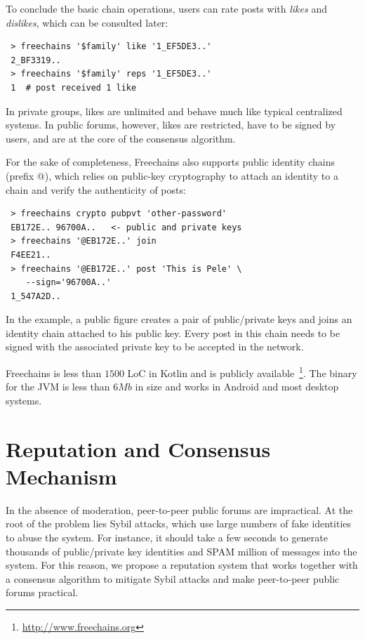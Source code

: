\documentclass[10pt,journal,compsoc]{IEEEtran}
\newcommand{\FC}       {Freechains\xspace}
\begin{document}
To conclude the basic chain operations, users can rate posts with \emph{likes}
and \emph{dislikes}, which can be consulted later:

{\footnotesize
\begin{verbatim}
 > freechains '$family' like '1_EF5DE3..'
 2_BF3319..
 > freechains '$family' reps '1_EF5DE3..'
 1  # post received 1 like
\end{verbatim}
}

In private groups, likes are unlimited and behave much like typical centralized
systems.
In public forums, however, likes are restricted, have to be signed by users,
and are at the core of the consensus algorithm.

For the sake of completeness, \FC also supports public identity chains (prefix
$@$), which relies on public-key cryptography to attach an identity to a chain
and verify the authenticity of posts:

{\footnotesize
\begin{verbatim}
 > freechains crypto pubpvt 'other-password'
 EB172E.. 96700A..   <- public and private keys
 > freechains '@EB172E..' join
 F4EE21..
 > freechains '@EB172E..' post 'This is Pele' \
    --sign='96700A..'
 1_547A2D..
\end{verbatim}
}

In the example, a public figure creates a pair of public/private keys and joins
an identity chain attached to his public key.
Every post in this chain needs to be signed with the associated private key to
be accepted in the network.

\FC is less than $1500$ LoC in Kotlin and is publicly
available~\footnote{\url{http://www.freechains.org}}.
The binary for the JVM is less than $6Mb$ in size and works in Android and most
desktop systems.

\section{Reputation and Consensus Mechanism}
\label{sec.consensus}

In the absence of moderation, peer-to-peer public forums are impractical.
At the root of the problem lies Sybil attacks, which use large numbers of fake
identities to abuse the system.
For instance, it should take a few seconds to generate thousands of
public/private key identities and SPAM million of messages into the system.
For this reason, we propose a reputation system that works together with a
consensus algorithm to mitigate Sybil attacks and make peer-to-peer public
forums practical.
\end{document}
